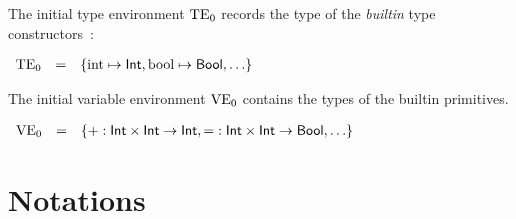 \medskip
The initial type environment $\text{TE}_0$ records the type of the \emph{builtin} type constructors~:

$\begin{array}{lcl}
\text{TE}_0 & = & \{ \hbox{int}\mapsto \mathsf{Int}, \hbox{bool}\mapsto \mathsf{Bool}, \ldots \}
\end{array}$


\medskip
The initial variable environment $\text{VE}_0$ contains the types of the builtin
primitives.

$\begin{array}{lcl}
\text{VE}_0 & = & \{ \mathbf{+} : \mathsf{Int} \times \mathsf{Int} \rightarrow \mathsf{Int}, \mathbf{=} : \mathsf{Int} \times
            \mathsf{Int} \rightarrow \mathsf{Bool}, \ldots \} \\
\end{array}$

\section{Notations}
\label{sec:typing-notations}


